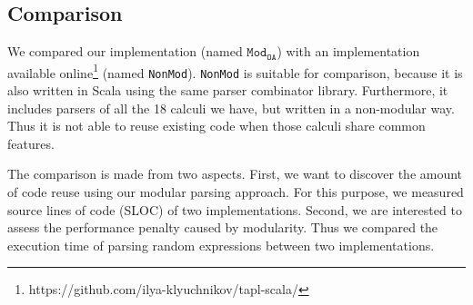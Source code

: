 





\subsection{Comparison}\label{subsec:cs-comparison}

\newcommand\ourimpl{$\texttt{Mod}_{\texttt{OA}}$}
\newcommand\ilyaimpl{\texttt{NonMod}}
\newcommand\ourclass{$\texttt{Mod}_{\texttt{CLASS}}$}
\newcommand\ilyalongest{$\texttt{NonMod}_{\texttt{|||}}$}

We compared our implementation (named \ourimpl{}) with an implementation
available online\footnote{https://github.com/ilya-klyuchnikov/tapl-scala/} (named \ilyaimpl{}).
\ilyaimpl{} is suitable for comparison, because it is also
written in Scala using the same parser combinator library.
Furthermore, it includes parsers of all the 18 calculi we have, but
written in a non-modular way. Thus it is not able to reuse existing
code when those calculi share common features.

The comparison is made from two aspects. First, we want to discover
the amount of code reuse using our modular parsing approach.
For this purpose, we measured source lines of code (SLOC) of two implementations.
Second, we are interested to assess the performance penalty caused by modularity.
Thus we compared the execution time of parsing random expressions between two implementations.

